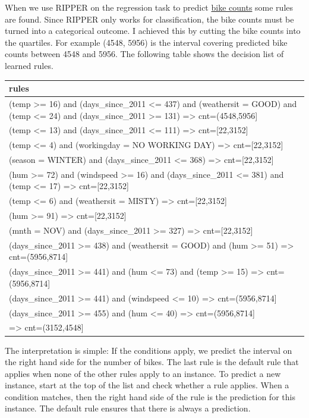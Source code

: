\documentclass[
  11pt,
]{scrbook}
\begin{document}
When we use RIPPER on the regression task to predict \protect\hyperlink{bike-data}{bike counts} some rules are found.
Since RIPPER only works for classification, the bike counts must be turned into a categorical outcome.
I achieved this by cutting the bike counts into the quartiles.
For example (4548, 5956) is the interval covering predicted bike counts between 4548 and 5956.
The following table shows the decision list of learned rules.

\begin{table}
\centering
\begin{tabular}{>{\raggedright\arraybackslash}p{10cm}}
\toprule
rules\\
\midrule
(temp >= 16) and (days\_since\_2011 <= 437) and (weathersit = GOOD) and (temp <= 24) and (days\_since\_2011 >= 131) => cnt=(4548,5956]\\
(temp <= 13) and (days\_since\_2011 <= 111) => cnt=[22,3152]\\
(temp <= 4) and (workingday = NO WORKING DAY) => cnt=[22,3152]\\
(season = WINTER) and (days\_since\_2011 <= 368) => cnt=[22,3152]\\
(hum >= 72) and (windspeed >= 16) and (days\_since\_2011 <= 381) and (temp <= 17) => cnt=[22,3152]\\
\addlinespace
(temp <= 6) and (weathersit = MISTY) => cnt=[22,3152]\\
(hum >= 91) => cnt=[22,3152]\\
(mnth = NOV) and (days\_since\_2011 >= 327) => cnt=[22,3152]\\
(days\_since\_2011 >= 438) and (weathersit = GOOD) and (hum >= 51) => cnt=(5956,8714]\\
(days\_since\_2011 >= 441) and (hum <= 73) and (temp >= 15) => cnt=(5956,8714]\\
\addlinespace
(days\_since\_2011 >= 441) and (windspeed <= 10) => cnt=(5956,8714]\\
(days\_since\_2011 >= 455) and (hum <= 40) => cnt=(5956,8714]\\
=> cnt=(3152,4548]\\
\bottomrule
\end{tabular}
\end{table}

The interpretation is simple:
If the conditions apply, we predict the interval on the right hand side for the number of bikes.
The last rule is the default rule that applies when none of the other rules apply to an instance.
To predict a new instance, start at the top of the list and check whether a rule applies.
When a condition matches, then the right hand side of the rule is the prediction for this instance.
The default rule ensures that there is always a prediction.
\end{document}
